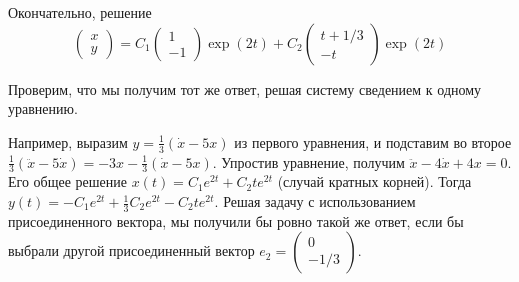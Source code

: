 \begin{problem}
\begin{sol}
Окончательно, решение
\[
\left(\begin{array}{c} {x} \\ {y} \end{array}\right)=C_{1} \left(\begin{array}{c} {1} \\ {-1} \end{array}\right)\exp (2t)+C_{2} \left(\begin{array}{c} {t+1/3} \\ {-t} \end{array}\right)\exp (2t)
\]

Проверим, что мы получим тот же ответ, решая систему сведением к одному уравнению.

Например, выразим $y=\frac{1}{3} (\dot{x}-5x)$ из первого уравнения, и подставим во второе $\frac{1}{3} (\ddot{x}-5\dot{x})=-3x-\frac{1}{3} (\dot{x}-5x)$. Упростив уравнение, получим $\ddot{x}-4\dot{x}+4x=0$. Его общее решение $x(t)=C_{1} e^{2t} +C_{2} te^{2t} $ (случай кратных корней). Тогда $y(t)=-C_{1} e^{2t} +\frac{1}{3} C_{2} e^{2t} -C_{2} te^{2t} $. Решая задачу с использованием присоединенного вектора, мы получили бы ровно такой же ответ, если бы выбрали другой присоединенный вектор $e_{2} =\left(\begin{array}{c} {0} \\ {-1/3} \end{array}\right)$.
\end{sol}
\end{problem}





